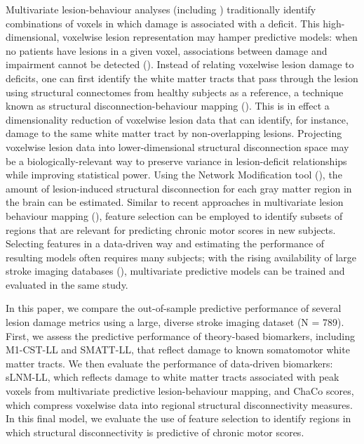 \documentclass[phd,tocprelim]{cornell}
\begin{document}
Multivariate lesion-behaviour analyses (including \cite{Bowren2022-rs}) traditionally identify combinations of voxels in which damage is associated with a deficit. This high-dimensional, voxelwise lesion representation may hamper predictive models: when no patients have lesions in a given voxel, associations between damage and impairment cannot be detected (\cite{Kimberg2007-sk, Rorden2009-ae,Sperber2020-kp,Griffis2019-cy}). Instead of relating voxelwise lesion damage to deficits, one can first identify the white matter tracts that pass through the lesion using structural connectomes from healthy subjects as a reference, a technique known as structural disconnection-behaviour mapping (\cite{Kuceyeski2013-nk, Kuceyeski2016-vj, Salvalaggio2020-pe, Griffis2019-cy, Sperber2022-oj}). This is in effect a dimensionality reduction of voxelwise lesion data that can identify, for instance, damage to the same white matter tract by non-overlapping lesions. Projecting voxelwise lesion data into lower-dimensional structural disconnection space may be a biologically-relevant way to preserve variance in lesion-deficit relationships while improving statistical power. Using the Network Modification tool (\cite{Kuceyeski2013-nk}), the amount of lesion-induced structural disconnection for each gray matter region in the brain can be estimated. Similar to recent approaches in multivariate lesion behaviour mapping (\cite{Kasties2021-rm}), feature selection can be employed to identify subsets of regions that are relevant for predicting chronic motor scores in new subjects. Selecting features in a data-driven way and estimating the performance of resulting models often requires many subjects; with the rising availability of large stroke imaging databases (\cite{Liew2020-ps}), multivariate predictive models can be trained and evaluated in the same study.

In this paper, we compare the out-of-sample predictive performance of several lesion damage metrics using a large, diverse stroke imaging dataset (N = 789). First, we assess the predictive performance of theory-based biomarkers, including M1-CST-LL and SMATT-LL, that reflect damage to known somatomotor white matter tracts. We then evaluate the performance of data-driven biomarkers: sLNM-LL, which reflects damage to white matter tracts associated with peak voxels from multivariate predictive lesion-behaviour mapping, and ChaCo scores, which compress voxelwise data into regional structural disconnectivity measures. In this final model, we evaluate the use of feature selection to identify regions in which structural disconnectivity is predictive of chronic motor scores.
\end{document}
